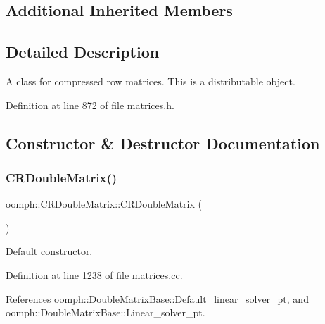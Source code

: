 \subsection*{Additional Inherited Members}


\subsection{Detailed Description}
A class for compressed row matrices. This is a distributable object. 

Definition at line 872 of file matrices.\+h.



\subsection{Constructor \& Destructor Documentation}
\mbox{\label{classoomph_1_1CRDoubleMatrix_ad8914fa1a5a98f7602a1724b76eef26c}} 
\subsubsection{\texorpdfstring{C\+R\+Double\+Matrix()}{CRDoubleMatrix()}\hspace{0.1cm}{\footnotesize\ttfamily [1/4]}}
{\footnotesize\ttfamily oomph\+::\+C\+R\+Double\+Matrix\+::\+C\+R\+Double\+Matrix (\begin{DoxyParamCaption}{ }\end{DoxyParamCaption})}



Default constructor. 



Definition at line 1238 of file matrices.\+cc.



References oomph\+::\+Double\+Matrix\+Base\+::\+Default\+\_\+linear\+\_\+solver\+\_\+pt, and oomph\+::\+Double\+Matrix\+Base\+::\+Linear\+\_\+solver\+\_\+pt.

\mbox{\label{classoomph_1_1CRDoubleMatrix_a1f1ffece5cbd2d25d46fe3db3b9c3ff5}} 
